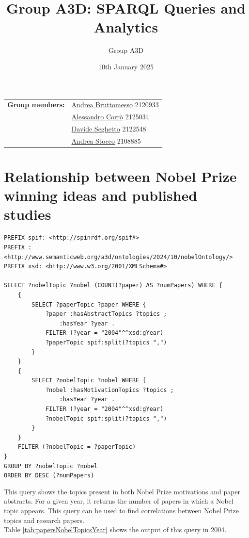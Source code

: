\documentclass{article}
\title{Group A3D: SPARQL Queries and Analytics}
\author{Group A3D}
\date{10th January 2025}
\begin{document}
\maketitle

\begin{tabular}{@{}ll}
	\textbf{Group members:}
	 & \href{mailto:andrea.bruttomesso.1@studenti.unipd.it}{Andrea Bruttomesso} 2120933 \\
	 & \href{mailto:alessandro.corro.1@studenti.unipd.it}{Alessandro Corr\`o} 2125034   \\
	 & \href{mailto:davide.seghetto@studenti.unipd.it}{Davide Seghetto} 2122548         \\
	 & \href{mailto:andrea.stocco.8@studenti.unipd.it}{Andrea Stocco} 2108885           \\
\end{tabular}

\section{Relationship between Nobel Prize winning ideas and published studies}
\begin{lstlisting}
PREFIX spif: <http://spinrdf.org/spif#>
PREFIX : <http://www.semanticweb.org/a3d/ontologies/2024/10/nobelOntology/>
PREFIX xsd: <http://www.w3.org/2001/XMLSchema#>

SELECT ?nobelTopic ?nobel (COUNT(?paper) AS ?numPapers) WHERE {
    {
        SELECT ?paperTopic ?paper WHERE {
            ?paper :hasAbstractTopics ?topics ;
               	:hasYear ?year .
            FILTER (?year = "2004"^^xsd:gYear)
            ?paperTopic spif:split(?topics ",")
        }
    }
    {
        SELECT ?nobelTopic ?nobel WHERE {
            ?nobel :hasMotivationTopics ?topics ;
                :hasYear ?year .
            FILTER (?year = "2004"^^xsd:gYear)
            ?nobelTopic spif:split(?topics ",")
        }
    }
    FILTER (?nobelTopic = ?paperTopic)
}
GROUP BY ?nobelTopic ?nobel
ORDER BY DESC (?numPapers)
\end{lstlisting}

This query shows the topics present in both Nobel Prize motivations and paper abstracts.
For a given year, it returns the number of papers in which a Nobel topic appears.
This query can be used to find correlations between Nobel Prize topics and research
papers.\\
Table \ref{tab:papersNobelTopicsYear} shows the output of this query in 2004.
\end{document}
